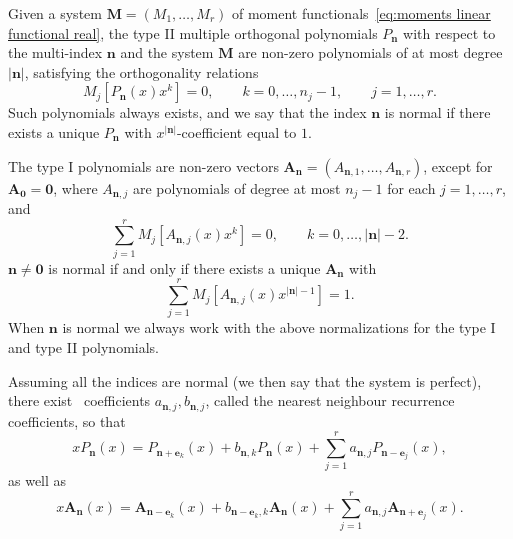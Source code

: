 \documentclass[reqno,centertags,11pt,draft]{amsart}
\newcommand{\N}{\mathbb{N}}
\newcommand{\abs}[1]{\left|#1\right|}
\begin{document}
Given a system $\bm{M} = (M_1,\dots,M_r)$ of moment functionals~\eqref{eq:moments linear functional real}, the type II multiple orthogonal polynomials $P_{\bm{n}}$ with respect to the multi-index $\bm{n}$ and the system $\bm{M}$ are non-zero polynomials of at most degree $\abs{\bm{n}}$, satisfying the orthogonality relations
\begin{equation}\label{eq:MOPRLIIreal}
    M_j[P_{\bm{n}}(x)x^k] = 0, \qquad k = 0,\dots,n_j-1, \qquad j = 1,\dots,r.
\end{equation}
Such polynomials always exists, and we say that the index $\bm{n}$ is normal if there exists a unique $P_{\bm{n}}$ with $x^{\abs{\bm{n}}}$-coefficient equal to $1$. %

The type I polynomials are non-zero vectors $\bm{A}_{\bm{n}} = (A_{\bm{n},1},\dots,A_{\bm{n},r})$, except for $\bm{A}_{\bm{0}} = \bm{0}$, where $A_{\bm{n},j}$ are polynomials of degree at most $n_j-1$ for each $j = 1,\dots,r$, and
\begin{equation}\label{eq:MOPRLIreal}
    \sum_{j = 1}^r M_j[A_{\bm{n},j}(x)x^k ] = 
        0, \qquad k = 0,\dots,\abs{\bm{n}}-2.
\end{equation}
$\bm{n} \neq \bm{0}$ is normal if and only if there exists a unique $\bm{A}_{\bm{n}}$ with
\begin{equation}\label{eq:normalization type I moprl}
    \sum_{j = 1}^r M_j[A_{\bm{n},j}(x) x^{\abs{\bm{n}}-1}] = 1. 
\end{equation}
When $\bm{n}$ is normal we always work with the above normalizations for the type I and type II polynomials. %

Assuming all the indices are normal (we then say that the system is perfect), there exist~\cite{NNRR,Ismail} coefficients $a_{\bm{n},j}, b_{\bm{n},j}$, called the nearest neighbour recurrence coefficients, so that 
\begin{equation}\label{eq:one nnr}
xP_{\bm{n}}(x) = P_{\bm{n} + \bm{e}_k}(x) + b_{\bm{n},k}P_{\bm{n}}(x) + \sum_{j = 1}^{r}a_{\bm{n},j}P_{\bm{n} - \bm{e}_j}(x),
\end{equation}
as well as
\begin{equation}\label{eq:type 1 recurrence relation}
x\bm{A}_{\bm{n}}(x) = \bm{A}_{\bm{n} - \bm{e}_k}(x) + b_{\bm{n}-\bm{e}_k,k}\bm{A}_{\bm{n}}(x) + \sum_{j = 1}^{r}a_{\bm{n},j}\bm{A}_{\bm{n} + \bm{e}_j}(x).
\end{equation}
\end{document}
